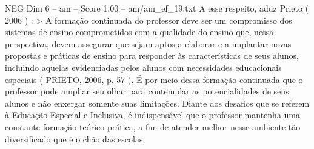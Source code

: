 \begin{textsample}{NEG Dim 6 – am – Score 1.00 – am/am\_ef\_19.txt}
A esse respeito, aduz Prieto ( 2006 ) : > A formação continuada do professor deve ser um compromisso dos sistemas de ensino comprometidos com a qualidade do ensino que, nessa perspectiva, devem assegurar que sejam aptos a elaborar e a implantar novas propostas e práticas de ensino para responder às características de seus alunos, incluindo aquelas evidenciadas pelos alunos com necessidades educacionais especiais ( PRIETO, 2006, p. 57 ).
É por meio dessa formação continuada que o professor pode ampliar seu olhar para contemplar as potencialidades de seus alunos e não enxergar somente suas limitações.
Diante dos desafios que se referem à Educação Especial e Inclusiva, é indispensável que o professor mantenha uma constante formação teórico-prática, a fim de atender melhor nesse ambiente tão diversificado que é o chão das escolas.

\end{textsample}
